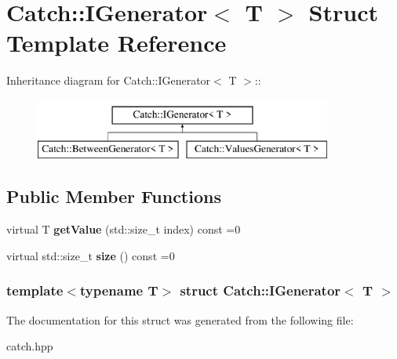 \hypertarget{structCatch_1_1IGenerator}{
\section{Catch::IGenerator$<$ T $>$ Struct Template Reference}
\label{structCatch_1_1IGenerator}
}
Inheritance diagram for Catch::IGenerator$<$ T $>$::\begin{figure}[H]
\begin{center}
\leavevmode
\includegraphics[height=2cm]{structCatch_1_1IGenerator}
\end{center}
\end{figure}
\subsection*{Public Member Functions}
\begin{DoxyCompactItemize}
\item 
\hypertarget{structCatch_1_1IGenerator_ad69e937cb66dba3ed9429c42abf4fce3}{
virtual T {\bfseries getValue} (std::size\_\-t index) const =0}
\label{structCatch_1_1IGenerator_ad69e937cb66dba3ed9429c42abf4fce3}

\item 
\hypertarget{structCatch_1_1IGenerator_a2e317253b03e838b6065ce69719a198e}{
virtual std::size\_\-t {\bfseries size} () const =0}
\label{structCatch_1_1IGenerator_a2e317253b03e838b6065ce69719a198e}

\end{DoxyCompactItemize}
\subsubsection*{template$<$typename T$>$ struct Catch::IGenerator$<$ T $>$}



The documentation for this struct was generated from the following file:\begin{DoxyCompactItemize}
\item 
catch.hpp\end{DoxyCompactItemize}
